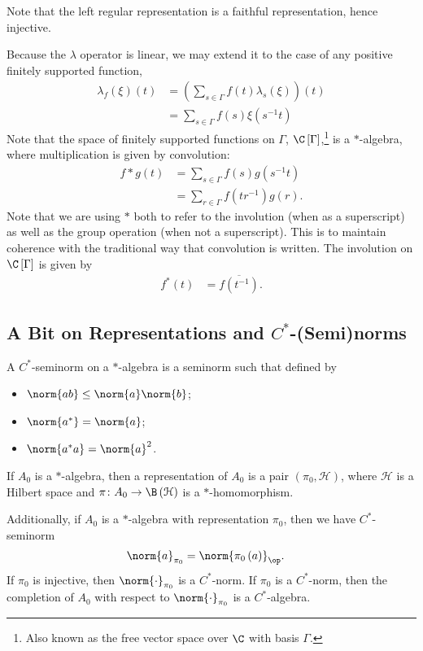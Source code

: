 \documentclass[10pt]{mypackage}
\begin{document}
Note that the left regular representation is a faithful representation, hence injective.\newline

Because the $\lambda$ operator is linear, we may extend it to the case of any positive finitely supported function,
\begin{align*}
  \lambda_{f}\left(\xi\right)(t) &= \left(\sum_{s\in\Gamma}f(t)\lambda_{s}\left(\xi\right)\right)\left(t\right)\\
                                 &= \sum_{s\in\Gamma}f(s)\xi\left(s^{-1}t\right)
\end{align*}
Note that the space of finitely supported functions on $\Gamma$, $\C\left[\Gamma\right]$,\footnote{Also known as the free vector space over $\C$ with basis $\Gamma$.} is a $\ast$-algebra, where multiplication is given by convolution:
\begin{align*}
  f\ast g(t) &= \sum_{s\in\Gamma}f\left(s\right)g\left(s^{-1}t\right)\\
             &= \sum_{r\in\Gamma}f\left(tr^{-1}\right)g(r).
\end{align*}
Note that we are using $\ast$ both to refer to the involution (when as a superscript) as well as the group operation (when not a superscript). This is to maintain coherence with the traditional way that convolution is written. The involution on $\C\left[\Gamma\right]$ is given by
\begin{align*}
  f^{\ast}\left(t\right) &= \overline{f\left(t^{-1}\right)}.
\end{align*}
\subsection{A Bit on Representations and $C^{\ast}$-(Semi)norms}%
A $C^{\ast}$-seminorm on a $\ast$-algebra is a seminorm such that defined by
\begin{itemize}
  \item $\norm{ab}\leq \norm{a}\norm{b}$;
  \item $\norm{a^{\ast}} = \norm{a}$;
  \item $\norm{a^{\ast}a} = \norm{a}^2$.
\end{itemize}
If $A_0$ is a $\ast$-algebra, then a representation of $A_0$ is a pair $\left(\pi_0,\mathcal{H}\right)$, where $\mathcal{H}$ is a Hilbert space and $\pi\colon A_0\rightarrow \B\left(\mathcal{H}\right)$ is a $\ast$-homomorphism.\newline

Additionally, if $A_0$ is a $\ast$-algebra with representation $\pi_0$, then we have $C^{\ast}$-seminorm
\begin{align*}
  \norm{a}_{\pi_0} &= \norm{\pi_0\left(a\right)}_{\op}.
\end{align*}
If $\pi_0$ is injective, then $\norm{\cdot}_{\pi_0}$ is a $C^{\ast}$-norm. If $\pi_0$ is a $C^{\ast}$-norm, then the completion of $A_0$ with respect to $\norm{\cdot}_{\pi_0}$ is a $C^{\ast}$-algebra.\newline
\end{document}
